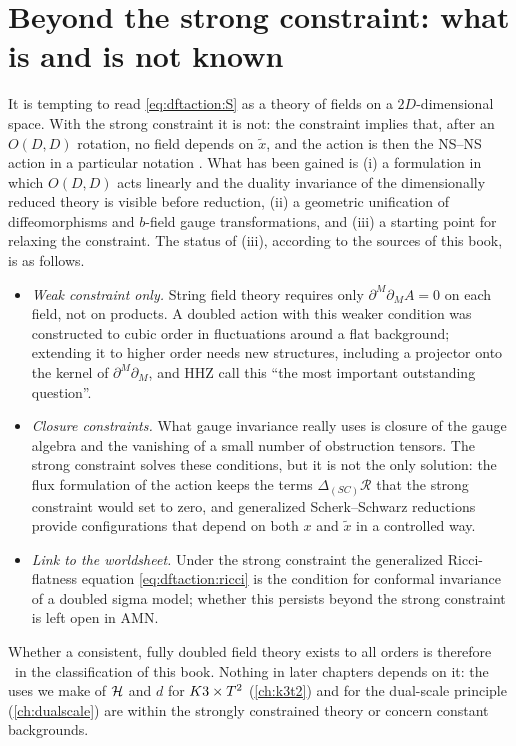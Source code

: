 \section{Beyond the strong constraint: what is and is not known}\label{sec:dftaction:beyond}

It is tempting to read \eqref{eq:dftaction:S} as a theory of fields on a $2D$-dimensional space.
With the strong constraint it is not: the constraint implies that, after an $O(D,D)$ rotation,
no field depends on $\tilde x$, and the action is then the NS--NS action in a particular
notation . What has been gained is
(i) a formulation in which $O(D,D)$ acts linearly and the duality invariance of the
dimensionally reduced theory is visible before reduction, (ii) a geometric unification of
diffeomorphisms and $b$-field gauge transformations, and (iii) a starting point for relaxing
the constraint. The status of (iii), according to the sources of this book, is as follows.

\begin{itemize}[leftmargin=*]
\item \emph{Weak constraint only.} String field theory requires only
$\partial^M\partial_MA=0$ on each field, not on products. A doubled action with this weaker
condition was constructed to cubic order in fluctuations around a flat background; extending
it to higher order needs new structures, including a projector onto the kernel of
$\partial^M\partial_M$, and HHZ call this ``the most important outstanding question''.
\TL {}
\item \emph{Closure constraints.} What gauge invariance really uses is closure of the gauge
algebra and the vanishing of a small number of obstruction tensors. The strong constraint solves
these conditions, but it is not the only solution: the flux formulation of the action keeps the
terms $\Delta_{(SC)}\mathcal R$ that the strong constraint would set to zero, and
generalized Scherk--Schwarz reductions provide configurations that depend on both $x$ and
$\tilde x$ in a controlled way. \TL {}
\item \emph{Link to the worldsheet.} Under the strong constraint the generalized Ricci-flatness
equation \eqref{eq:dftaction:ricci} is the condition for conformal invariance of a doubled
sigma model; whether this persists beyond the strong constraint is left open in AMN. \TL
{}
\end{itemize}
Whether a consistent, fully doubled field theory exists to all orders is therefore \TC\ in the
classification of this book. Nothing in later chapters depends on it: the uses we make of
$\mathcal{H}$ and $d$ for $K3\times T^2$ (\cref{ch:k3t2}) and for the dual-scale principle (\cref{ch:dualscale})
are within the strongly constrained theory or concern constant backgrounds.

